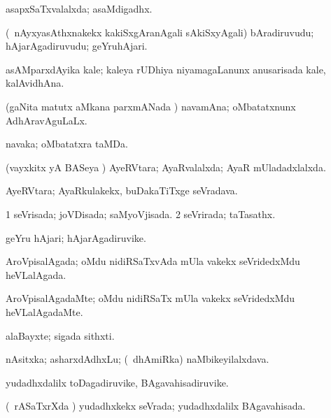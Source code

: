 \bentry
{}
\gl{\gu}
\bmng
asapxSaTxvalalxda; asaMdigadhx. 
\emng
\eentry

\bentry
{}
\gl{\nA}
\bmng
(\kanmu\ nAyxyasAthxnakekx kakiSxgAranAgali sAkiSxyAgali) bAradiruvudu; hAjarAgadiruvudu; geYruhAjari. 
\emng
\eentry

\bentry
{}
\gl{\nA}
\bmng
asAMparxdAyika kale; kaleya rUDhiya niyamagaLanunx anusarisada kale, kalAvidhAna. 
\emng
\eentry

\bentry
{}
\gl{\gu}
\bmng
(gaNita matutx aMkana parxmANada \vi) navamAna; oMbatatxnunx AdhAravAguLaLx. 
\emng
\eentry

\bentry
{}
\gl{\nA}
\bmng
navaka; oMbatatxra taMDa. 
\emng
\eentry

\bentry
{}
\gl{\gu}
\bmng
(vayxkitx yA BASeya \vi) AyeRVtara; AyaRvalalxda; AyaR mUladadxlalxda. 
\emng
\eentry

\bentry
{}
\gl{\nA}
\bmng
AyeRVtara; AyaRkulakekx, buDakaTiTxge seVradava. 
\emng
\eentry

\bentry
{}
\gl{\gu}
\bmng
\bnum
\num{1} seVrisada; joVDisada; saMyoVjisada. 
\num{2} seVrirada; taTasathx. 
\enum
\emng
\eentry

\bentry
{}
\gl{\nA}
\bmng
geYru hAjari; hAjarAgadiruvike. 
\emng
\eentry

\bentry
{}
\gl{\gu}
\bmng
AroVpisalAgada; oMdu nidiRSaTxvAda mUla \mo vakekx seVridedxMdu heVLalAgada. 
\emng
\eentry

\bentry
{}
\gl{\kirxvi}
\bmng
AroVpisalAgadaMte; oMdu nidiRSaTx mUla \mo vakekx seVridedxMdu heVLalAgadaMte. 
\emng
\eentry

\bentry
{}
\gl{\nA}
\bmng
alaBayxte; sigada sithxti. 
\emng
\eentry

\bentry
{}
\gl{\nA}
\bmng
nAsitxka; asharxdAdhxLu; (\kanmu\ dhAmiRka) naMbikeyilalxdava. 
\emng
\eentry

\bentry
{}
\gl{\nA}
\bmng
yudadhxdalilx toDagadiruvike, BAgavahisadiruvike. 
\emng
\eentry

\bentry
{}
\gl{\gu}
\bmng
(\kanmu\ rASaTxrXda \vi) yudadhxkekx seVrada; yudadhxdalilx BAgavahisada. 
\emng
\eentry

